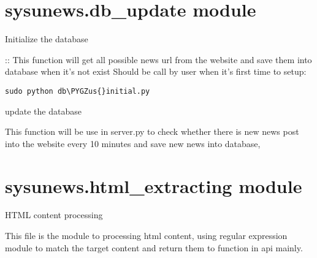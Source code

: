 \documentclass[letterpaper,10pt,english]{sphinxmanual}
\def\PYGZus{\char`\_}
\begin{document}
\section{sysunews.db\_update module}
\label{sysunews:sysunews-db-update-module}\label{sysunews:module-sysunews.db_update}

\begin{fulllineitems}
\label{sysunews:sysunews.db_update.initial}
Initialize the database

::
This function will get all possible news url from the website and save them into database when it's not exist
Should be call by user when it's first time to setup:

\begin{Verbatim}[commandchars=\\\{\}]
sudo python db\PYGZus{}initial.py
\end{Verbatim}

\end{fulllineitems}


\begin{fulllineitems}
\label{sysunews:sysunews.db_update.update}
update the database

This function will be use in server.py to check whether there is new news post into the website every 10 minutes and save new news into database,

\end{fulllineitems}



\section{sysunews.html\_extracting module}
\label{sysunews:module-sysunews.html_extracting}\label{sysunews:sysunews-html-extracting-module}
HTML content processing

This file is the module to processing html content, using regular expression module to match the target content and return them to function in api mainly.
\end{document}
